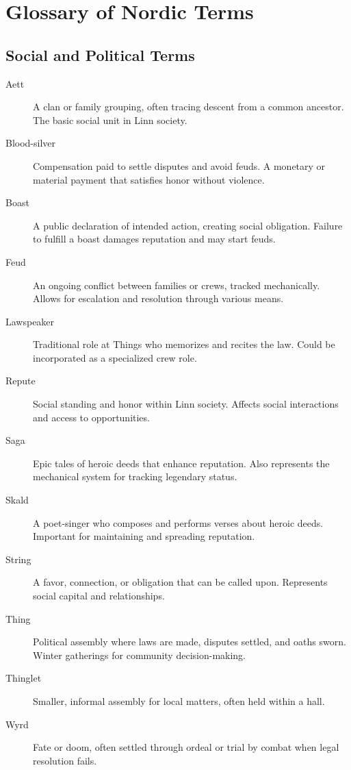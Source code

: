 \documentclass[11pt]{article}
\begin{document}
\section{Glossary of Nordic Terms}

\subsection{Social and Political Terms}

\begin{description}
    \item[Aett] A clan or family grouping, often tracing descent from a common ancestor. The basic social unit in Linn society.
    
    \item[Blood-silver] Compensation paid to settle disputes and avoid feuds. A monetary or material payment that satisfies honor without violence.
    
    \item[Boast] A public declaration of intended action, creating social obligation. Failure to fulfill a boast damages reputation and may start feuds.
    
    \item[Feud] An ongoing conflict between families or crews, tracked mechanically. Allows for escalation and resolution through various means.
    
    \item[Lawspeaker] Traditional role at Things who memorizes and recites the law. Could be incorporated as a specialized crew role.
    
    \item[Repute] Social standing and honor within Linn society. Affects social interactions and access to opportunities.
    
    \item[Saga] Epic tales of heroic deeds that enhance reputation. Also represents the mechanical system for tracking legendary status.
    
    \item[Skald] A poet-singer who composes and performs verses about heroic deeds. Important for maintaining and spreading reputation.
    
    \item[String] A favor, connection, or obligation that can be called upon. Represents social capital and relationships.
    
    \item[Thing] Political assembly where laws are made, disputes settled, and oaths sworn. Winter gatherings for community decision-making.
    
    \item[Thinglet] Smaller, informal assembly for local matters, often held within a hall.
    
    \item[Wyrd] Fate or doom, often settled through ordeal or trial by combat when legal resolution fails.
\end{description}
\end{document}
